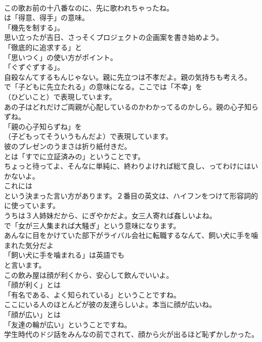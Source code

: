 \documentclass[8pt]{extreport}
\begin{document}
\begin{CJK}{UTF8}{min}
\\	この歌お前の十八番なのに、先に歌われちゃったね。 
\\	は「得意、得手」の意味。
\\	「機先を制する」。	
\\	思い立ったが吉日、さっそくプロジェクトの企画案を書き始めよう。 
\\	「徹底的に追求する」と
\\	「思いつく」の使い方がポイント。
\\	「ぐずぐずする」。	
\\	自殺なんてするもんじゃない。親に先立つは不孝だよ。親の気持ちも考えろ。 
\\	で「子どもに先立たれる」の意味になる。ここでは「不幸」を 
\\	（ひどいこと）で表現しています。	
\\	あの子はどれだけご両親が心配しているのかわかってるのかしら。親の心子知らずね。 
\\	「親の心子知らずね」を 
\\	（子どもってそういうもんだよ）で表現しています。	
\\	彼のプレゼンのうまさは折り紙付きだ。 
\\	とは「すでに立証済みの」ということです。	
\\	ちょっと待ってよ、そんなに単純に、終わりよければ総て良し、ってわけにはいかないよ。 
\\	これには
\\	という決まった言い方があります。２番目の英文は、ハイフンをつけて形容詞的に使っています。	
\\	うちは３人姉妹だから、にぎやかだよ。女三人寄れば姦しいよね。 
\\	で「女が三人集まれば大騒ぎ」という意味になります。	
\\	あんなに目をかけていた部下がライバル会社に転職するなんて、飼い犬に手を噛まれた気分だよ 
\\	「飼い犬に手を噛まれる」は英語でも
\\	と言います。	
\\	この飲み屋は顔が利くから、安心して飲んでいいよ。 
\\	「顔が利く」とは
\\	「有名である、よく知られている」ということですね。	
\\	ここにいる人のほとんどが彼の友達らしいよ。本当に顔が広いね。 
\\	「顔が広い」とは
\\	「友達の輪が広い」ということですね。	
\\	学生時代のドジ話をみんなの前でされて、顔から火が出るほど恥ずかしかった。 

\end{CJK}
\end{document}
